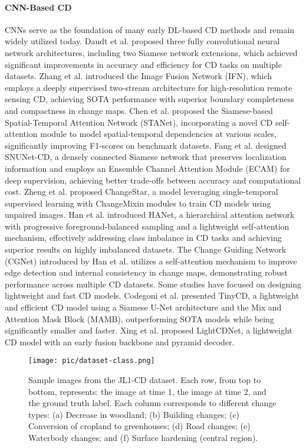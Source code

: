 \paragraph{CNN-Based CD}  
CNNs serve as the foundation of many early DL-based CD methods and remain widely utilized today.
Daudt et al. \cite{fcsn} proposed three fully convolutional neural network architectures, including two Siamese network extensions, which achieved significant improvements in accuracy and efficiency for CD tasks on multiple datasets.
Zhang et al. \cite{ifn} introduced the Image Fusion Network (IFN), which employs a deeply supervised two-stream architecture for high-resolution remote sensing CD, achieving SOTA performance with superior boundary completeness and compactness in change maps.
Chen et al. \cite{stanet} proposed the Siamese-based Spatial-Temporal Attention Network (STANet), incorporating a novel CD self-attention module to model spatial-temporal dependencies at various scales, significantly improving F1-scores on benchmark datasets.
Fang et al. \cite{snunet} designed SNUNet-CD, a densely connected Siamese network that preserves localization information and employs an Ensemble Channel Attention Module (ECAM) for deep supervision, achieving better trade-offs between accuracy and computational cost.
Zheng et al. \cite{changestar} proposed ChangeStar, a model leveraging single-temporal supervised learning with ChangeMixin modules to train CD models using unpaired images.
Han et al. \cite{hanet} introduced HANet, a hierarchical attention network with progressive foreground-balanced sampling and a lightweight self-attention mechanism, effectively addressing class imbalance in CD tasks and achieving superior results on highly imbalanced datasets.
The Change Guiding Network (CGNet) introduced by Han et al. \cite{cgnet} utilizes a self-attention mechanism to improve edge detection and internal consistency in change maps, demonstrating robust performance across multiple CD datasets.
Some studies have focused on designing lightweight and fast CD models.
Codegoni et al. \cite{tinycd} presented TinyCD, a lightweight and efficient CD model using a Siamese U-Net architecture and the Mix and Attention Mask Block (MAMB), outperforming SOTA models while being significantly smaller and faster.
Xing et al. \cite{lightcdnet} proposed LightCDNet, a lightweight CD model with an early fusion backbone and pyramid decoder.

\begin{figure*}[!t]
    \centering
    \texttt{[image: pic/dataset-class.png]}
    \caption{Sample images from the JL1-CD dataset. Each row, from top to bottom, represents: the image at time 1, the image at time 2, and the ground truth label. Each column corresponds to different change types: (a) Decrease in woodland; (b) Building changes; (c) Conversion of cropland to greenhouses; (d) Road changes; (e) Waterbody changes; and (f) Surface hardening (central region).}
    \label{fig:dataset-class}
\end{figure*}

